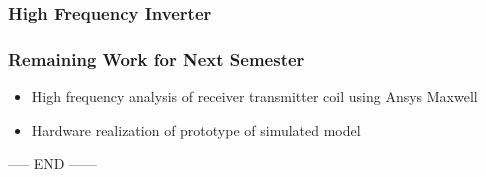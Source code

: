 \documentclass{beamer}
\begin{document}
\begin{frame}
  \frametitle{High Frequency Inverter}

  

\end{frame}
\begin{frame}
  \frametitle{Remaining Work for Next Semester}
  \begin{itemize}
    \item High frequency analysis of receiver transmitter coil using Ansys Maxwell
    \item Hardware realization of prototype of simulated model
  \end{itemize}
\end{frame}

\begin{frame}
  \center
  {\huge ----- END ------}
\end{frame}
\end{document}
